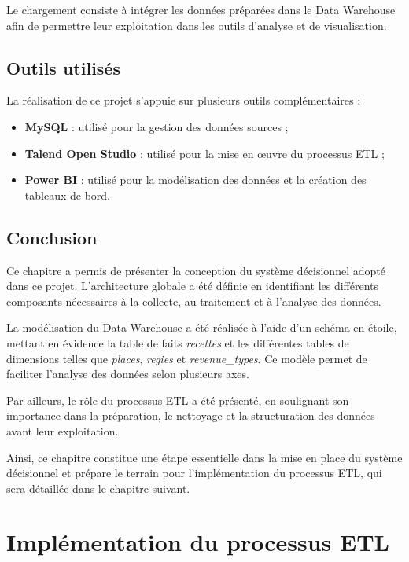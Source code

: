 \documentclass[12pt,a4paper]{report}
\begin{document}
Le chargement consiste à intégrer les données préparées dans le Data Warehouse afin de permettre leur exploitation dans les outils d’analyse et de visualisation.


\section{Outils utilisés}

La réalisation de ce projet s’appuie sur plusieurs outils complémentaires :

\begin{itemize}
	\item \textbf{MySQL} : utilisé pour la gestion des données sources ;
	\item \textbf{Talend Open Studio} : utilisé pour la mise en œuvre du processus ETL ;
	\item \textbf{Power BI} : utilisé pour la modélisation des données et la création des tableaux de bord.
\end{itemize}


\section*{Conclusion}

Ce chapitre a permis de présenter la conception du système décisionnel adopté dans ce projet. L’architecture globale a été définie en identifiant les différents composants nécessaires à la collecte, au traitement et à l’analyse des données.

La modélisation du Data Warehouse a été réalisée à l’aide d’un schéma en étoile, mettant en évidence la table de faits \textit{recettes} et les différentes tables de dimensions telles que \textit{places}, \textit{regies} et \textit{revenue\_types}. Ce modèle permet de faciliter l’analyse des données selon plusieurs axes.

Par ailleurs, le rôle du processus ETL a été présenté, en soulignant son importance dans la préparation, le nettoyage et la structuration des données avant leur exploitation.

Ainsi, ce chapitre constitue une étape essentielle dans la mise en place du système décisionnel et prépare le terrain pour l’implémentation du processus ETL, qui sera détaillée dans le chapitre suivant.
\chapter{Implémentation du processus ETL}
\end{document}
